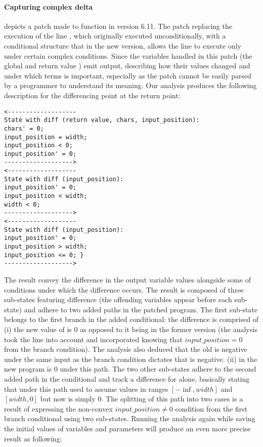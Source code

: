\paragraph{Capturing complex delta}
 depicts a patch made to  function in version 6.11. The patch replacing the execution of the line , which originally executed unconditionally, with a conditional structure that in the new version, allows the line to execute only under certain complex conditions. Since the variables handled in this patch (the global  and return value ) emit output, describing how their values changed and under which terms is important, especially as the patch cannot be easily parsed by a programmer to understand its meaning. Our analysis produces the following description for the differencing point at the return point:
\begin{lstlisting}
<-------------------
State with diff (return value, chars, input_position):
chars' = 0;
input_position = width;
input_position < 0;
input_position' = 0;
------------------->
<-------------------
State with diff (input_position):
input_position' = 0;
input_position < width;
width < 0;
------------------->
<-------------------
State with diff (input_position):
input_position' = 0;
input_position > width;
input_position <= 0; }
------------------->
\end{lstlisting}
The result convey the difference in the output variable values alongside some of conditions under which the difference occurs. The result is composed of three sub-states featuring difference (the offending variables appear before each sub-state) and adhere to two added paths in the patched program. The first sub-state belongs to the first branch in the added conditional: the difference is comprised of (i) the new value of  is 0 as opposed to it being  in the former version (the analysis took the  line into account and incorporated knowing that $input\_position = 0$ from the branch condition). The analysis also deduced that the old  is negative under the same input as the branch condition dictates that  is negative. (ii)  in the new program is 0 under this path. The two other sub-states adhere to the second added path in the conditional and track a difference for  alone, basically stating that  under this path used to assume values in ranges $[-\inf,width]$ and $[width,0]$ but now is simply 0. The splitting of this path into two cases is a result of expressing the non-convex $input\_position \neq 0$ condition from the first branch conditional using two sub-states. Running the analysis again while saving the initial values of variables and parameters will produce an even more precise result as following:
